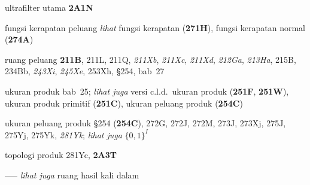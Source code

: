 ultrafilter utama {\bf 2A1N}










fungsi kerapatan peluang {\it lihat} fungsi kerapatan ({\bf 271H}),
fungsi kerapatan normal ({\bf 274A})


ruang peluang {\bf 211B}, 211L, 211Q, {\it 211Xb}, {\it 211Xc}, {\it 211Xd},
{\it 212Ga}, {\it 213Ha}, 215B, 234Bb, {\it 243Xi},
{\it 245Xe}, 253Xh, \S254, bab\ 27











  





ukuran produk bab\ 25; 
  {\it lihat juga} versi c.l.d.\ ukuran produk ({\bf 251F}, {\bf 251W}),
ukuran produk primitif ({\bf 251C}),
ukuran peluang produk ({\bf 254C})












ukuran peluang produk \S254 ({\bf 254C}), 272G, 272J, 272M,
273J, 273Xj, 275J, 275Yj, 275Yk, {\it 281Yk}; 
  {\it lihat juga } $\{0,1\}^I$















topologi produk 281Yc, {\bf 2A3T}




----- {\it lihat juga} ruang hasil kali dalam






















































